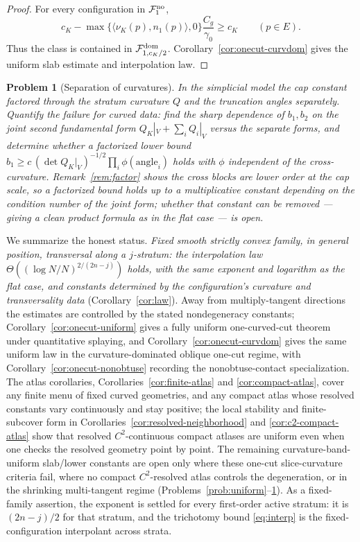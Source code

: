 \documentclass[11pt]{article}
\newtheorem{problem}[theorem]{Problem}
\begin{document}
\begin{proof}
For every configuration in \(\mathcal F^{\rm no}_{1}\),
\[
  c_K-\max\{\langle\nu_K(p),n_1(p)\rangle,0\}\frac{C_g}{\gamma_0}
  \ge c_K
  \qquad(p\in E).
\]
Thus the class is contained in
\(\mathcal F^{\rm dom}_{1,c_K/2}\).  Corollary~\ref{cor:onecut-curvdom}
gives the uniform slab estimate and interpolation law.
\end{proof}

\begin{problem}[Separation of curvatures]\label{prob:factor}
In the simplicial model the cap constant factored through the stratum curvature
$Q$ and the truncation angles separately.  Quantify the failure for curved data:
find the sharp dependence of $b_1,b_2$ on the joint second fundamental form
$Q_K|_V+\sum_iQ_i|_V$ versus the separate forms, and determine whether a
factorized lower bound
$b_1\ge c\,(\det Q_K|_V)^{-1/2}\prod_i\phi(\text{angle}_i)$ holds with $\phi$
independent of the cross-curvature.  Remark~\ref{rem:factor} shows the cross
blocks are lower order at the cap scale, so a factorized bound holds \emph{up to
a multiplicative constant depending on the condition number of the joint form};
whether that constant can be removed --- giving a clean product formula as in the
flat case --- is open.
\end{problem}

We summarize the honest status.  \emph{Fixed smooth strictly convex family, in
general position, transversal along a $j$-stratum: the interpolation law
$\Theta((\log N/N)^{2/(2n-j)})$ holds, with the same exponent and logarithm as
the flat case, and constants determined by the configuration's curvature and
transversality data} (Corollary~\ref{cor:law}).  Away from multiply-tangent
directions the estimates are controlled by the stated nondegeneracy constants;
Corollary~\ref{cor:onecut-uniform} gives a fully uniform one-curved-cut theorem
under quantitative splaying, and Corollary~\ref{cor:onecut-curvdom} gives the
same uniform law in the curvature-dominated oblique one-cut regime, with
Corollary~\ref{cor:onecut-nonobtuse} recording the nonobtuse-contact
specialization.  The atlas
corollaries, Corollaries~\ref{cor:finite-atlas} and \ref{cor:compact-atlas},
cover any finite menu of fixed curved geometries, and any compact atlas whose
resolved constants vary continuously and stay positive; the local stability and
finite-subcover form in Corollaries~\ref{cor:resolved-neighborhood} and
\ref{cor:c2-compact-atlas} show that resolved \(C^2\)-continuous compact
atlases are uniform even when one checks the resolved geometry point by point.
The remaining curvature-band-uniform slab/lower constants are open only where
these one-cut slice-curvature criteria fail, where no compact \(C^2\)-resolved
atlas controls the degeneration, or in the shrinking multi-tangent regime
(Problems~\ref{prob:uniform}--\ref{prob:factor}).
As a fixed-family assertion, the exponent is settled for every first-order
active stratum: it is $(2n-j)/2$ for that stratum, and the trichotomy bound
\eqref{eq:interp} is the fixed-configuration interpolant across strata.
\end{document}
